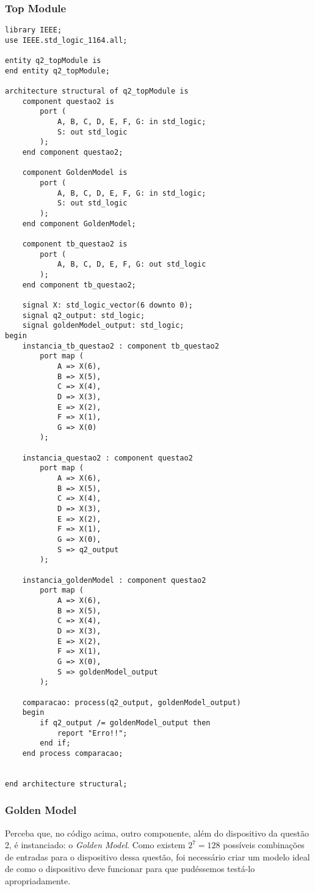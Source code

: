 \documentclass[a4paper,12pt]{article}
\newenvironment{code}{\captionsetup{type=listing}}{}
\begin{document}
\subsubsection{Top Module}
\begin{code}
    \begin{verbatim}
library IEEE;
use IEEE.std_logic_1164.all;

entity q2_topModule is
end entity q2_topModule;

architecture structural of q2_topModule is
    component questao2 is
        port (
            A, B, C, D, E, F, G: in std_logic;
            S: out std_logic
        );
    end component questao2;

    component GoldenModel is
        port (
            A, B, C, D, E, F, G: in std_logic;
            S: out std_logic
        );
    end component GoldenModel;

    component tb_questao2 is
        port (
            A, B, C, D, E, F, G: out std_logic
        );
    end component tb_questao2;

    signal X: std_logic_vector(6 downto 0);
    signal q2_output: std_logic;
    signal goldenModel_output: std_logic;
begin
    instancia_tb_questao2 : component tb_questao2
        port map (
            A => X(6),
            B => X(5),
            C => X(4),
            D => X(3),
            E => X(2),
            F => X(1),
            G => X(0)
        );
    
    instancia_questao2 : component questao2
        port map (
            A => X(6),
            B => X(5),
            C => X(4),
            D => X(3),
            E => X(2),
            F => X(1),
            G => X(0),
            S => q2_output
        );
    
    instancia_goldenModel : component questao2
        port map (
            A => X(6),
            B => X(5),
            C => X(4),
            D => X(3),
            E => X(2),
            F => X(1),
            G => X(0),
            S => goldenModel_output
        );

    comparacao: process(q2_output, goldenModel_output)
    begin
        if q2_output /= goldenModel_output then
            report "Erro!!";
        end if;
    end process comparacao;


end architecture structural;
    \end{verbatim}
    \caption{Top module da questão 2}
\end{code}

\subsubsection{Golden Model}
Perceba que, no código acima, outro componente, além do dispositivo da questão 2, é instanciado: o \textit{Golden Model}. Como existem $2^7 = 128$ possíveis combinações de entradas para o dispositivo dessa questão, foi necessário criar um modelo ideal de como o dispositivo deve funcionar para que pudéssemos testá-lo apropriadamente.
\end{document}
